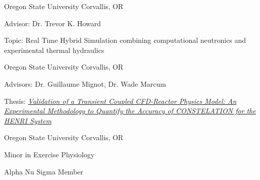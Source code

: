 
\begin{cventries}
  \cventry
    {} %
    {Oregon State University} %
    {Corvallis, OR} %
    {} %
    {
      \begin{cvitems} %
         \item{Advisor: Dr. Trevor K. Howard}
         \item{Topic: Real Time Hybrid Simulation combining computational neutronics and experimental thermal hydraulics}
      \end{cvitems}
    }
    
  \cventry
    {} %
    {Oregon State University} %
    {Corvallis, OR} %
    {} %
    {
      \begin{cvitems} %
         \item{Advisors: Dr. Guillaume Mignot, Dr. Wade Marcum}
         \item{Thesis: \href{https://ir.library.oregonstate.edu/concern/graduate_thesis_or_dissertations/qj72ph23p?locale=en}{\textit{Validation of a Transient Coupled CFD-Reactor Physics Model: An Experimental Methodology to Quantify the Accuracy of CONSTELATION for the HENRI System}}}
      \end{cvitems}
    }

  \cventry
    {} %
    {Oregon State University} %
    {Corvallis, OR} %
    {} %
    {
      \begin{cvitems} %
         \item{Minor in Exercise Physiology}
         \vspace{0.5mm}
         \item {Alpha Nu Sigma Member}
      \end{cvitems}
    }
    

\end{cventries}
